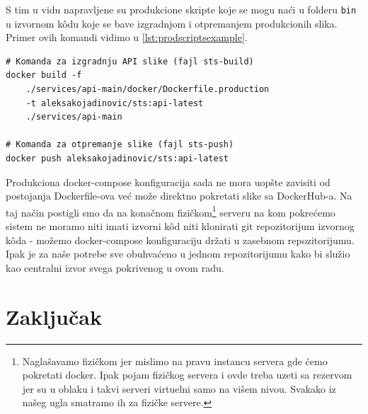 \documentclass[12pt,oneside]{memoir}
\begin{document}
S tim u vidu napravljene su produkcione skripte koje se mogu naći u folderu \verb|bin| u izvornom k\^{o}du koje se bave izgradnjom i otpremanjem produkcionih slika. Primer ovih komandi vidimo u \ref{lst:prodscriptsexample}.

\begin{lstlisting}[caption={docker-compose komande.}, label={lst:prodscriptsexample}]
# Komanda za izgradnju API slike (fajl sts-build)
docker build -f 
    ./services/api-main/docker/Dockerfile.production 
    -t aleksakojadinovic/sts:api-latest 
    ./services/api-main

# Komanda za otpremanje slike (fajl sts-push)
docker push aleksakojadinovic/sts:api-latest

\end{lstlisting}

Produkciona docker-compose konfiguracija sada ne mora uopšte zavisiti od postojanja Dockerfile-ova već može direktno pokretati slike sa DockerHub-a. Na taj način postigli smo da na konačnom fizičkom\footnote{Naglašavamo fizičkom jer mislimo na pravu instancu servera gde ćemo pokretati docker. Ipak pojam fizičkog servera i ovde treba uzeti sa rezervom jer su u oblaku i takvi serveri virtuelni samo na višem nivou. Svakako iz našeg ugla smatramo ih za fizičke servere.} serveru na kom pokrećemo sistem ne moramo niti imati izvorni k\^{o}d niti klonirati git repozitorijum izvornog k\^{o}da - možemo docker-compose konfiguraciju držati u zasebnom repozitorijumu. Ipak je za naše potrebe sve obuhvaćeno u jednom repozitorijumu kako bi služio kao centralni izvor svega pokrivenog u ovom radu.


\chapter{Zaključak}



\literatura

\backmatter

\begin{biografija}

\end{biografija}
\end{document}
